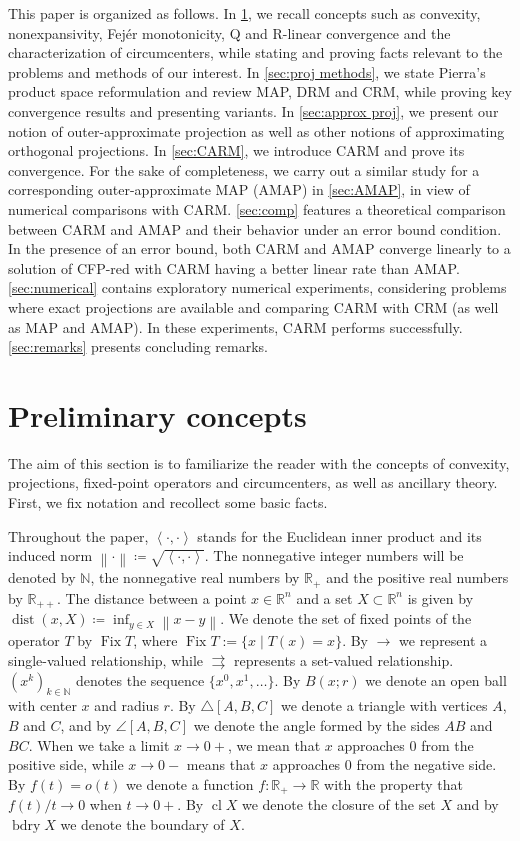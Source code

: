\documentclass[smallextended,numbook,nospthms]{svjour3}
\theoremstyle{plain}
\theoremstyle{definition}
\def\RR{\mathds R}
\def\NN{\mathds N}
\DeclareMathOperator{\Fix}{Fix}
\DeclareMathOperator{\dist}{dist}
\newcommand{\norm}[1]{\left\lVert#1\right\rVert}
\newcommand{\scal}[2]{\left\langle{#1},{#2}  \right\rangle}
\begin{document}
This paper is organized as follows. In \cref{sec:prelim}, we recall concepts such as convexity, nonexpansivity, Fejér monotonicity, Q and R-linear convergence and the characterization of circumcenters, while stating and proving facts relevant to the problems and methods of our interest. In \cref{sec:proj methods}, we state Pierra's product space reformulation and review MAP, DRM and CRM, while proving key convergence results and presenting variants. In \cref{sec:approx proj}, we present our notion of outer-approximate projection as well as other notions of approximating orthogonal projections. In \cref{sec:CARM}, we introduce CARM and prove its convergence. For the sake of completeness, we carry out a similar study for a corresponding outer-approximate MAP (AMAP) in \cref{sec:AMAP}, in view of numerical comparisons with CARM. \cref{sec:comp} features a theoretical comparison between CARM and AMAP and their behavior under an error bound condition. In the presence of an error bound, both CARM and AMAP converge linearly to a solution of CFP-red with CARM having a better linear rate than AMAP. \cref{sec:numerical} contains exploratory numerical experiments, considering problems where exact projections are available and comparing CARM with CRM (as well as MAP and AMAP). In these experiments, CARM performs successfully. \cref{sec:remarks} presents concluding remarks.

\newpage
\section{Preliminary concepts}\label{sec:prelim}
The aim of this section is to familiarize the reader with the concepts of convexity, projections, fixed-point operators and circumcenters, as well as ancillary theory. First, we fix notation and recollect some basic facts.      

Throughout the paper, $\scal{\cdot}{\cdot}$ stands for the Euclidean inner product and its induced  norm $\norm{\cdot}\coloneqq\sqrt{\scal{\cdot}{\cdot}}$. The nonnegative integer numbers will be denoted by $\NN$, the nonnegative real numbers by $\RR_{+}$ and the positive real numbers by $\RR_{++}$. The distance between a point $x\in\RR^{n}$ and a set $X\subset \RR^{n}$ is given by $\dist(x,X)\coloneqq \inf_{y\in X} \norm{x-y}$. We denote the set of fixed points of the operator $T$ by $\Fix T$, where $\Fix T := \{x \mid T(x)=x\}$. By $\rightarrow$ we represent a single-valued relationship, while $\rightrightarrows$ represents a set-valued relationship. $(x^k)_{k \in \NN}$ denotes the sequence $\{x^0, x^1, \ldots\}$. By $B(x;r)$ we denote an open ball with center $x$ and radius $r$. By $\triangle{[A, B, C]}$ we denote a triangle with vertices $A$, $B$ and $C$, and by $\angle{[A, B, C]}$ we denote the angle formed by the sides $AB$ and $BC$. When we take a limit $x \rightarrow 0+$, we mean that $x$ approaches 0 from the positive side, while $x \rightarrow 0-$ means that $x$ approaches 0 from the negative side. By $f(t)=o(t)$ we denote a function $f:\RR_{+} \rightarrow \RR$ with the property that $f(t)/t \rightarrow 0$ when $t \rightarrow 0+$. By $\operatorname{cl} X$ we denote the closure of the set $X$ and by $\operatorname{bdry} X$ we denote the boundary of $X$.
\end{document}
